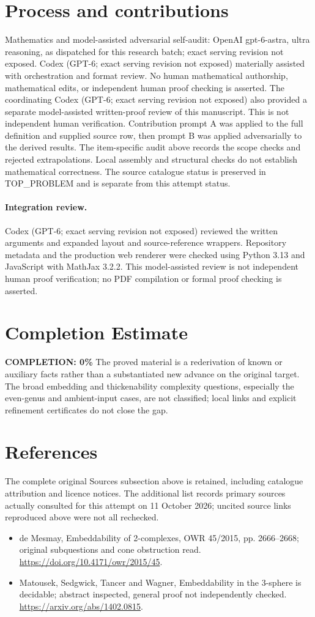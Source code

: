\documentclass[11pt]{article}
\begin{document}
\section{Process and contributions}
Mathematics and model-assisted adversarial self-audit: OpenAI gpt-6-astra, ultra reasoning, as dispatched for this research batch; exact serving revision not exposed. Codex (GPT-6; exact serving revision not exposed) materially assisted with orchestration and format review. No human mathematical authorship, mathematical edits, or independent human proof checking is asserted.
The coordinating Codex (GPT-6; exact serving revision not exposed) also provided a separate model-assisted written-proof review of this manuscript. This is not independent human verification.
Contribution prompt A was applied to the full definition and supplied source row, then prompt B was applied adversarially to the derived results. The item-specific audit above records the scope checks and rejected extrapolations. Local assembly and structural checks do not establish mathematical correctness. The source catalogue status is preserved in TOP\_PROBLEM and is separate from this attempt status.
\paragraph{Integration review.} Codex (GPT-6; exact serving revision not exposed) reviewed the written arguments and expanded layout and source-reference wrappers. Repository metadata and the production web renderer were checked using Python 3.13 and JavaScript with MathJax 3.2.2. This model-assisted review is not independent human proof verification; no PDF compilation or formal proof checking is asserted.

\section{Completion Estimate}
\noindent\textbf{COMPLETION: 0\%}
The proved material is a rederivation of known or auxiliary facts rather than a substantiated new advance on the original target. The broad embedding and thickenability complexity questions, especially the even-genus and ambient-input cases, are not classified; local links and explicit refinement certificates do not close the gap.
\section{References}
The complete original Sources subsection above is retained, including catalogue attribution and licence notices. The additional list records primary sources actually consulted for this attempt on 11 October 2026; uncited source links reproduced above were not all rechecked.
\begin{itemize}
\item de Mesmay, Embeddability of 2-complexes, OWR 45/2015, pp. 2666--2668; original subquestions and cone obstruction read. \url{https://doi.org/10.4171/owr/2015/45}.
\item Matousek, Sedgwick, Tancer and Wagner, Embeddability in the 3-sphere is decidable; abstract inspected, general proof not independently checked. \url{https://arxiv.org/abs/1402.0815}.
\end{itemize}
\end{document}
